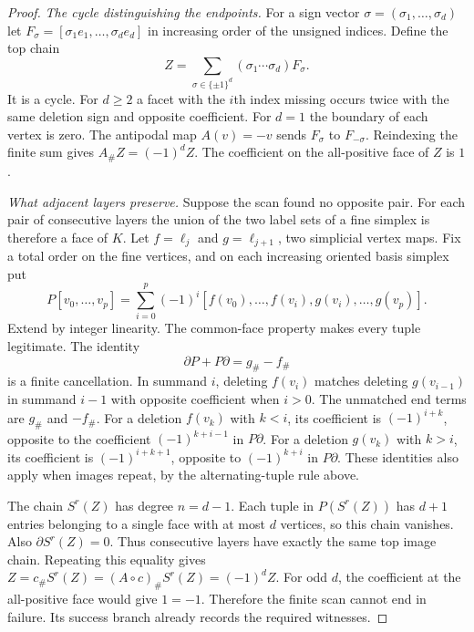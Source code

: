 \begin{proof}
\par\smallskip\noindent\textit{The cycle distinguishing the endpoints.}\enspace
For a sign vector $\sigma=(\sigma_1,\ldots,\sigma_d)$ let
$F_\sigma=[\sigma_1 e_1,\ldots,\sigma_d e_d]$ in increasing
order of the unsigned indices. Define the top chain
\[
                    Z=\sum_{\sigma\in\{\pm1\}^d}
                           (\sigma_1\cdots\sigma_d) F_\sigma.
\]
It is a cycle. For $d\ge2$ a facet with the $i$th index missing occurs
twice with the same deletion sign and opposite coefficient. For $d=1$
the boundary of each vertex is zero. The antipodal map $A(v)=-v$
sends $F_\sigma$ to $F_{-\sigma}$. Reindexing the finite sum gives
$A_\#Z=(-1)^d Z$. The coefficient on the all-positive face of $Z$ is $1$.

\par\smallskip\noindent\textit{What adjacent layers preserve.}\enspace
Suppose the scan found no opposite pair. For each pair of consecutive
layers the union of the two label sets of a fine simplex is therefore
a face of $K$. Let $f=\ell_j$ and $g=\ell_{j+1}$, two simplicial
vertex maps. Fix a total order on the fine vertices, and on each
increasing oriented basis simplex put
\[
 P[v_0,\ldots,v_p]=\sum_{i=0}^p(-1)^i
 [f(v_0),\ldots,f(v_i),g(v_i),\ldots,g(v_p)] .
\]
Extend by integer linearity. The common-face property makes every
tuple legitimate. The identity
\[
                \partial P+P\partial=g_\#-f_\#
\]
is a finite cancellation. In summand $i$, deleting $f(v_i)$ matches
deleting $g(v_{i-1})$ in summand $i-1$ with opposite coefficient
when $i>0$. The unmatched end terms are $g_\#$ and $-f_\#$.
For a deletion $f(v_k)$ with $k<i$, its coefficient is $(-1)^{i+k}$,
opposite to the coefficient $(-1)^{k+i-1}$ in $P\partial$.
For a deletion $g(v_k)$ with $k>i$, its coefficient is
$(-1)^{i+k+1}$, opposite to $(-1)^{k+i}$ in $P\partial$.
These identities also apply when images repeat, by the alternating-tuple
rule above.

The chain $S^r(Z)$ has degree $n=d-1$. Each tuple in $P(S^r(Z))$
has $d+1$ entries belonging to a single face with at most $d$ vertices,
so this chain vanishes. Also $\partial S^r(Z)=0$. Thus consecutive
layers have exactly the same top image chain. Repeating this equality
gives $Z=c_\#S^r(Z)=(A\circ c)_\#S^r(Z)=(-1)^d Z$.
For odd $d$, the coefficient at the all-positive face would give
$1=-1$. Therefore the finite scan cannot end in failure. Its success
branch already records the required witnesses.
\end{proof}

